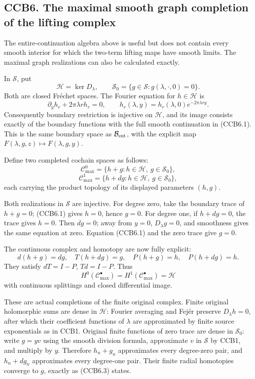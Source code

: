 \subsection{CCB6. The maximal smooth graph completion of the lifting
complex}\label{ccb6.-the-maximal-smooth-graph-completion-of-the-lifting-complex}

The entire-continuation algebra above is useful but does not contain
every smooth interior for which the two-term lifting maps have smooth
limits. The maximal graph realizations can also be calculated exactly.

In \(\mathcal S\), put \[
\mathcal H=\ker D_\lambda,\qquad
\mathcal S_0=\{g\in\mathcal S:g(\lambda,\cdot,0)=0\}.
\] Both are closed Fréchet spaces. The Fourier equation for
\(h\in\mathcal H\) is \[
\partial_yh_r+2\pi\lambda r h_r=0,\qquad
h_r(\lambda,y)=h_r(\lambda,0)e^{-2\pi\lambda ry}.
\tag{CCB6.1}
\] Consequently boundary restriction is injective on \(\mathcal H\), and
its image consists exactly of the boundary functions with the full
smooth continuation in (CCB6.1). This is the same boundary space as
\(\mathcal B_{\rm ent}\), with the explicit map
\(F(\lambda,g,z)\mapsto F(\lambda,g,y)\).

Define two completed cochain spaces as follows: \[
\mathcal C^0_{\max}
=\{h+g:h\in\mathcal H,\ g\in\mathcal S_0\},
\] \[
\mathcal C^1_{\max}
=\{h+dg:h\in\mathcal H,\ g\in\mathcal S_0\},
\tag{CCB6.2}
\] each carrying the product topology of its displayed parameters
\((h,g)\).

Both realizations in \(\mathcal S\) are injective. For degree zero, take
the boundary trace of \(h+g=0\); (CCB6.1) gives \(h=0\), hence \(g=0\).
For degree one, if \(h+dg=0\), the trace gives \(h=0\). Then \(dg=0\);
away from \(y=0\), \(D_\lambda g=0\), and smoothness gives the same
equation at zero. Equation (CCB6.1) and the zero trace give \(g=0\).

The continuous complex and homotopy are now fully explicit: \[
d(h+g)=dg,\quad
T(h+dg)=g,\quad
P(h+g)=h,\quad P(h+dg)=h.
\tag{CCB6.3}
\] They satisfy \(dT=I-P\), \(Td=I-P\). Thus \[
H^0(\mathcal C^\bullet_{\max})=
H^1(\mathcal C^\bullet_{\max})=\mathcal H
\tag{CCB6.4}
\] with continuous splittings and closed differential image.

These are actual completions of the finite original complex. Finite
original holomorphic sums are dense in \(\mathcal H\): Fourier averaging
and Fejér preserve \(D_\lambda h=0\), after which their coefficient
functions of \(\lambda\) are approximated by finite source exponentials
as in CCB1. Original finite functions of zero trace are dense in
\(\mathcal S_0\): write \(g=yv\) using the smooth division formula,
approximate \(v\) in \(\mathcal S\) by CCB1, and multiply by \(y\).
Therefore \(h_n+g_n\) approximates every degree-zero pair, and
\(h_n+dg_n\) approximates every degree-one pair. Their finite radial
homotopies converge to \(g\), exactly as (CCB6.3) states.

